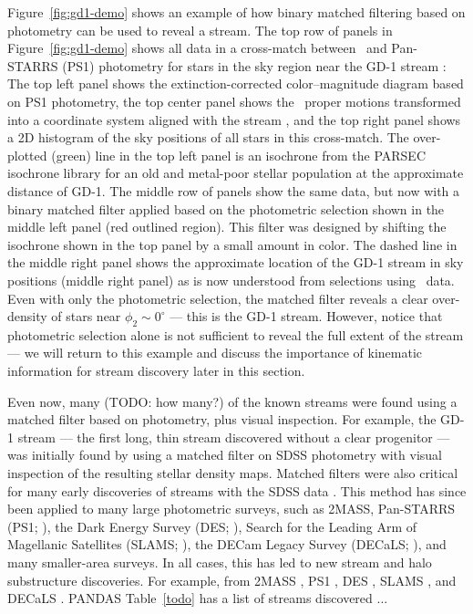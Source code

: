 \documentclass[final,5p,times,twocolumn,authoryear]{elsarticle}
\begin{document}
Figure~\ref{fig:gd1-demo} shows an example of how binary matched filtering based on
photometry can be used to reveal a stream.
The top row of panels in Figure~\ref{fig:gd1-demo} shows all data in a cross-match
between \gaia\ and Pan-STARRS (PS1) photometry for stars in the sky region near the GD-1
stream \citep{Grillmair:2006-gd1}: The top left panel shows the extinction-corrected
color--magnitude diagram based on PS1 photometry, the top center panel shows the \gaia\
proper motions transformed into a coordinate system aligned with the stream
\citep{koposov:2009}, and the top right panel shows a 2D histogram of the sky positions
of all stars in this cross-match.
The over-plotted (green) line in the top left panel is an isochrone from the PARSEC
\citep{parsec} isochrone library for an old and metal-poor stellar population at the
approximate distance of GD-1.
The middle row of panels show the same data, but now with a binary matched filter
applied based on the photometric selection shown in the middle left panel (red outlined
region).
This filter was designed by shifting the isochrone shown in the top panel by a small
amount in color.
The dashed line in the middle right panel shows the approximate location of the GD-1
stream in sky positions (middle right panel) as is now understood from selections using
\gaia\ data.
Even with only the photometric selection, the matched filter reveals a clear
over-density of stars near $\phi_2 \sim 0^\circ$ --- this is the GD-1 stream.
However, notice that photometric selection alone is not sufficient to reveal the full
extent of the stream --- we will return to this example and discuss the importance of
kinematic information for stream discovery later in this section.

Even now, many (TODO: how many?) of the known streams were found using a matched filter
based on photometry, plus visual inspection.
For example, the GD-1 stream --- the first long, thin stream discovered without a clear
progenitor --- was initially found by \citet{Grillmair:2006-gd1} using a matched filter
on SDSS photometry with visual inspection of the resulting stellar density maps.
Matched filters were also critical for many early discoveries of streams with the SDSS
data \citep[e.g.,][]{Newberg:2002,Yanny:2003, Belokurov:2006, Grillmair:2006-orphan}.
This method has since been applied to many large photometric surveys, such as 2MASS,
Pan-STARRS (PS1; \citealt{todo}), the Dark Energy Survey (DES; \citealt{todo}), Search
for the Leading Arm of Magellanic Satellites (SLAMS; \citealt{todo}), the DECam Legacy
Survey  (DECaLS; \citealt{todo}), and many smaller-area surveys.
In all cases, this has led to new stream and halo substructure discoveries.
For example, from 2MASS \citep{Rocha-Pinto, GASS, Anticenterstream}, PS1
\citep{Bernard, Ophiuchus, others?}, DES \citep{Shipp:2018}, SLAMS \citep{Jethwa:2018},
and DECaLS \citep{Shipp:2021}. PANDAS
Table~\ref{todo} has a list of streams discovered ...
\end{document}
